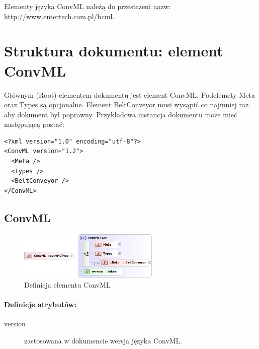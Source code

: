 \documentclass[12pt,a4paper]{article}
\begin{document}
Elementy języka ConvML należą do przestrzeni nazw:
http://www.entertech.com.pl/bcml.

\section{Struktura dokumentu: element ConvML}

Głównym (Root) elementem dokumentu jest element ConvML. Podelemety Meta oraz
Types są opcjonalne. Element BeltConveyor musi wysąpić co najmniej raz aby
dokument był poprawny. Przykładowa instancja dokumentu może mieć następującą
postać:

\begin{verbatim}
<?xml version="1.0" encoding="utf-8"?>
<ConvML version="1.2">
  <Meta />
  <Types />
  <BeltConveyor />
</ConvML>
\end{verbatim}  

\subsection{ConvML}

\begin{figure}[h]
\centering
\includegraphics[width=0.6\textwidth]{png/convml_xsd2}
\caption{Definicja elementu ConvML}
\label{fig:convml-xsd}
\end{figure}

\paragraph{Definicje atrybutów:}
\begin{description}
\item[version] zastosowana w dokumencie wersja języka ConvML.
\end{description}
\end{document}
